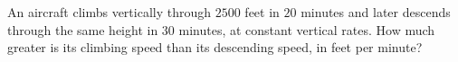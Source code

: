 An aircraft climbs vertically through $2500$ feet in $20$ minutes and later descends through the same height in $30$ minutes, at constant vertical rates. How much greater is its climbing speed than its descending speed, in feet per minute?
